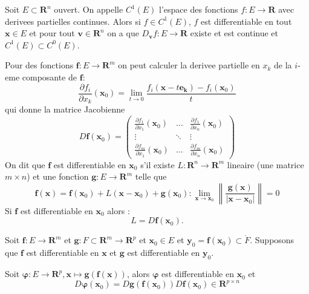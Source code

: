 \begin{definition}
Soit $E\subset \mathbf{R}^{n}$ ouvert. On appelle $C^{1}(E)$ l'espace des fonctions $f:E\to \mathbf{R}$ avec derivees partielles continues. Alors si $f\in C^{1}(E)$, $f$ est differentiable en tout $\boldsymbol{x}\in E$ et pour tout $\boldsymbol{v}\in \mathbf{R}^{n}$ on a que $D_{\boldsymbol{v}}f:E\to \mathbf{R}$ existe et est continue et $C^{1}(E)\subset C^{0}(E)$.
\end{definition}


Pour des fonctions $\boldsymbol{f}:E\to \mathbf{R}^{m}$ on peut calculer la derivee partielle en $x_{k}$ de la $i$-eme composante de $\boldsymbol{f}$:
$$
\frac{ \partial f_{i} }{ \partial x_{k} }(\boldsymbol{x}_0)=\lim_{ t \to 0 }  \frac{f_{i}(\boldsymbol{x}-t\boldsymbol{e_{k}})-f_{i}(\boldsymbol{x}_{0})}{t}
$$
qui donne la matrice Jacobienne
$$
D\boldsymbol{f}(\boldsymbol{x}_{0})=\begin{pmatrix}
\frac{ \partial f_{1} }{ \partial x_{1} }(\boldsymbol{x}_{0}) &  \dots &  \frac{ \partial f_{1} }{ \partial x_{n} }(\boldsymbol{x}_{0})  \\
\vdots & \ddots & \vdots \\
\frac{ \partial f_{m} }{ \partial x_{1} }(\boldsymbol{x}_{0}) & \dots & \frac{ \partial f_{m} }{ \partial x_{n} }  (\boldsymbol{x}_{0})
\end{pmatrix}
$$
On dit que $\boldsymbol{f}$ est differentiable en $\boldsymbol{x}_{0}$ s'il existe $L:\mathbf{R}^{n}\to \mathbf{R}^{m}$ lineaire (une matrice $m\times n$) et une fonction $\boldsymbol{g}:E\to \mathbf{R}^{m}$ telle que
$$
\boldsymbol{f}(\boldsymbol{x})=\boldsymbol{f}(\boldsymbol{x}_{0})+L(\boldsymbol{x}-\boldsymbol{x}_{0})+\boldsymbol{g}(\boldsymbol{x}_{0}):\lim_{ \boldsymbol{x} \to \boldsymbol{x}_{0}} \left\lVert  \frac{\boldsymbol{g}(\boldsymbol{x})}{\lvert \boldsymbol{x}-\boldsymbol{x}_{0} \rvert }  \right\rVert =0
$$
Si $\boldsymbol{f}$ est differentiable en $\boldsymbol{x}_{0}$ alors :
$$
L=D\boldsymbol{f}(\boldsymbol{x}_{0}).
$$
\begin{proposition}
Soit $\boldsymbol{f}:E\to \mathbf{R}^{m}$ et $\boldsymbol{g}:F\subset \mathbf{R}^{m}\to \mathbf{R}^{p}$ et $\boldsymbol{x}_{0}\in E$ et $\boldsymbol{y}_{0}=\boldsymbol{f}(\boldsymbol{x}_{0})\subset \mathring{F}$. Supposons que $\boldsymbol{f}$ est differentiable en $\boldsymbol{x}$ et $\boldsymbol{g}$ est differentiable en $\boldsymbol{y}_{0}$.

Soit $\boldsymbol{\varphi}:E\to \mathbf{R}^{p}, \boldsymbol{x} \mapsto \boldsymbol{g}(\boldsymbol{f}(\boldsymbol{x}))$, alors $\boldsymbol{\varphi}$ est differentiable en $\boldsymbol{x}_{0}$ et 
$$
D\boldsymbol{\varphi}(\boldsymbol{x}_{0})=D\boldsymbol{g}(\boldsymbol{f}(\boldsymbol{x}_{0}))D\boldsymbol{f}(\boldsymbol{x}_{0})\in \mathbf{R}^{p\times n}
$$
\end{proposition}